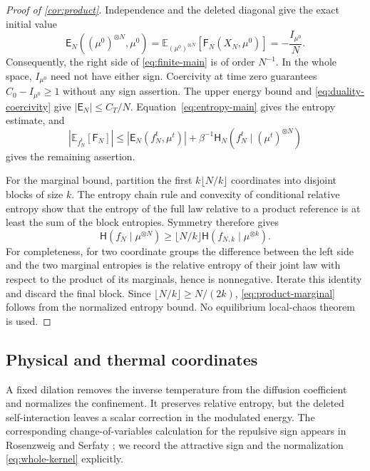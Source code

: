 \documentclass[11pt,reqno]{amsart}
\numberwithin{equation}{section}
\theoremstyle{definition}
\theoremstyle{remark}
\newcommand{\E}{\mathbb E}
\newcommand{\Hr}{\mathsf H}
\newcommand{\Fr}{\mathsf F}
\newcommand{\Er}{\mathsf E}
\begin{document}
\begin{proof}[Proof of \cref{cor:product}]
Independence and the deleted diagonal give the exact initial value
\begin{equation}\label{eq:product-expectation}
 \Er_N((\mu^0)^{\otimes N},\mu^0)
 =\E_{(\mu^0)^{\otimes N}}[\Fr_N(X_N,\mu^0)]
 =-\frac{I_{\mu^0}}{N}.
\end{equation}
Consequently, the right side of \eqref{eq:finite-main} is of order $N^{-1}$. In the whole space, $I_{\mu^0}$ need not have either sign. Coercivity at time zero guarantees $C_0-I_{\mu^0}\geq1$ without any sign assertion. The upper energy bound and \eqref{eq:duality-coercivity} give $|\Er_N|\leq C_T/N$. Equation~\eqref{eq:entropy-main} gives the entropy estimate, and
\begin{equation}\label{eq:mean-energy-absolute}
 |\E_{f_N^t}[\Fr_N]|\leq |\Er_N(f_N^t,\mu^t)|+
                  \beta^{-1}\Hr_N(f_N^t\mid(\mu^t)^{\otimes N})
\end{equation}
gives the remaining assertion.

For the marginal bound, partition the first $k\lfloor N/k\rfloor$ coordinates into disjoint blocks of size $k$. The entropy chain rule and convexity of conditional relative entropy show that the entropy of the full law relative to a product reference is at least the sum of the block entropies. Symmetry therefore gives
\begin{equation}\label{eq:marginal-entropy-blocks}
 \Hr(f_N\mid\mu^{\otimes N})\geq\lfloor N/k\rfloor
                         \Hr(f_{N,k}\mid\mu^{\otimes k}).
\end{equation}
For completeness, for two coordinate groups the difference between the left side and the two marginal entropies is the relative entropy of their joint law with respect to the product of its marginals, hence is nonnegative. Iterate this identity and discard the final block. Since $\lfloor N/k\rfloor\geq N/(2k)$, \eqref{eq:product-marginal} follows from the normalized entropy bound. No equilibrium local-chaos theorem is used.
\end{proof}


\begingroup\ifdefined\MarkedRevision\color{red}\fi
\subsection{Physical and thermal coordinates}\label{subsec:thermal-coordinates}

A fixed dilation removes the inverse temperature from the diffusion coefficient and normalizes the confinement. It preserves relative entropy, but the deleted self-interaction leaves a scalar correction in the modulated energy. The corresponding change-of-variables calculation for the repulsive sign appears in Rosenzweig and Serfaty \cite[Lemmas~2.2--2.3]{RSselfsimilar}; we record the attractive sign and the normalization \eqref{eq:whole-kernel} explicitly.
\end{document}
